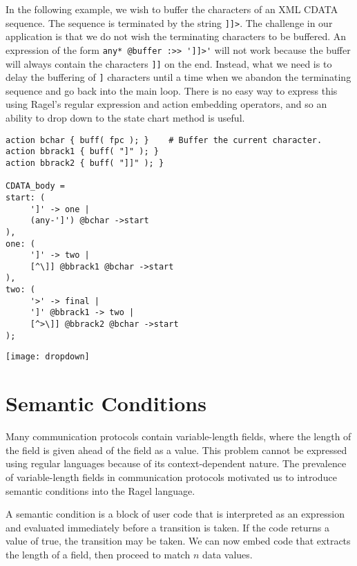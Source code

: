 \documentclass[letterpaper,11pt,oneside]{book}
\newcommand{\graphspace}{\vspace{10pt}}
\newenvironment{inline_code}{\def\baselinestretch{1}\vspace{12pt}\small}{}
\begin{document}
In the following example, we wish to buffer the characters of an XML CDATA
sequence. The sequence is terminated by the string \verb|]]>|. The challenge
in our application is that we do not wish the terminating characters to be
buffered. An expression of the form \verb|any* @buffer :>> ']]>'| will not work
because the buffer will always contain the characters \verb|]]| on the end.
Instead, what we need is to delay the buffering of \hspace{0.25mm} \verb|]|
characters until a time when we
abandon the terminating sequence and go back into the main loop. There is no
easy way to express this using Ragel's regular expression and action embedding
operators, and so an ability to drop down to the state chart method is useful.

\begin{inline_code}
\begin{verbatim}
action bchar { buff( fpc ); }    # Buffer the current character.
action bbrack1 { buff( "]" ); }
action bbrack2 { buff( "]]" ); }

CDATA_body =
start: (
     ']' -> one |
     (any-']') @bchar ->start
),
one: (
     ']' -> two |
     [^\]] @bbrack1 @bchar ->start
),
two: (
     '>' -> final |
     ']' @bbrack1 -> two |
     [^>\]] @bbrack2 @bchar ->start
);
\end{verbatim}
\end{inline_code}

\graphspace
\begin{center}
\texttt{[image: dropdown]}
\end{center}
\graphspace


\section{Semantic Conditions}
\label{semantic}

Many communication protocols contain variable-length fields, where the length
of the field is given ahead of the field as a value. This
problem cannot be expressed using regular languages because of its
context-dependent nature. The prevalence of variable-length fields in
communication protocols motivated us to introduce semantic conditions into
the Ragel language.

A semantic condition is a block of user code that is interpreted as an
expression and evaluated immediately
before a transition is taken. If the code returns a value of true, the
transition may be taken.  We can now embed code that extracts the length of a
field, then proceed to match $n$ data values.
\end{document}
